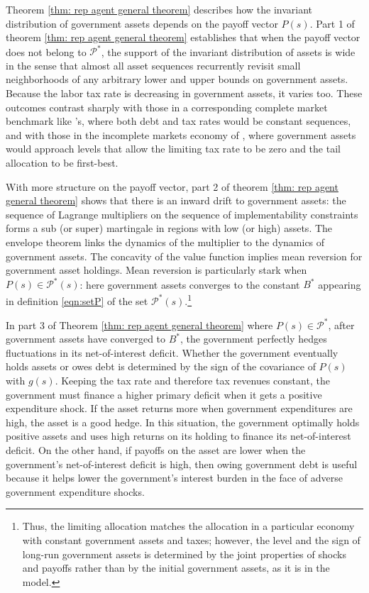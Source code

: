 \documentclass[thmsb,11pt]{article}
\begin{document}
\color{black}
Theorem \ref{thm: rep agent general theorem}  describes how  the invariant distribution of government assets depends on the payoff vector $P(s)$.
Part 1 of theorem \ref{thm: rep agent general theorem}  establishes that when the payoff vector does  not belong to $\mathcal{P}^*$, the support of the invariant distribution of assets is wide in the sense that almost all
asset sequences recurrently revisit  small neighborhoods of  any arbitrary lower and upper bounds on government assets.
Because the labor tax rate is decreasing in government assets, it varies too. These outcomes contrast sharply with those   in a corresponding complete market benchmark
like \citeauthor{LucasJr.1983}'s, where both debt and tax rates would be constant  sequences,  and with those in the incomplete markets economy of  \citeauthor{Aiyagari2002},
  where government assets would approach levels that allow the  limiting tax rate to be zero and the tail allocation to be first-best.

With more structure on the payoff vector, part 2 of  theorem \ref{thm: rep agent general theorem} shows that there is an  inward drift to government assets:
the sequence of Lagrange multipliers on the sequence of implementability constraints forms a sub (or super) martingale in  regions with low (or high) assets.
The envelope theorem links the dynamics of the multiplier to the dynamics  of government assets.  The concavity of the value function implies
mean reversion for government  asset holdings. Mean reversion is particularly stark when $P(s)\in \mathcal{P}^*(s)$: here  government assets converges to
the constant $B^*$ appearing in  definition \eqref{eqn:setP} of the set $\mathcal{P}^*(s)$.\footnote{Thus, the limiting allocation matches the allocation in
a particular \citeauthor{LucasJr.1983} economy  with constant government  assets and taxes; however,
the level and the sign of long-run government assets is determined by the joint properties of shocks and payoffs rather than
by the initial government assets,  as it is in the \citeauthor{LucasJr.1983} model.}



In part 3 of Theorem \ref{thm: rep agent general theorem} where  $P(s)\in\mathcal{P}^*$,
after government assets have converged to $B^*$, %
the government perfectly hedges fluctuations in
its net-of-interest deficit.   Whether the government eventually holds assets or owes  debt is determined
by the sign of the covariance of $P(s)$ with $g(s)$.
Keeping the tax rate and therefore tax revenues constant, the government must finance
a higher primary deficit when it gets a positive expenditure shock.
If the asset returns more when government expenditures are high, the asset is a good hedge. In this situation, the government optimally holds positive assets and uses high returns
on its holding to finance its  net-of-interest deficit. On the other hand,  if  payoffs on the asset  are lower  when the
government's net-of-interest deficit is high, then owing government debt is useful because it helps  lower the government's interest burden in the face of adverse government expenditure shocks.
\end{document}
